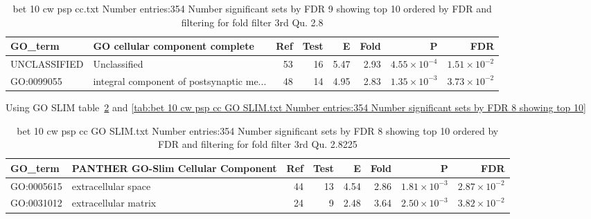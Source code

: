 \begin{table}[ht]
\centering
\begin{adjustbox}{width=\textwidth}
\begin{tabular}{llrrrrrr}
  \hline
GO\_term & GO cellular component complete & Ref & Test & E & Fold & P & FDR \\ 
  \hline
UNCLASSIFIED & Unclassified  & 53 & 16 & 5.47 & 2.93 & $4.55 \times 10^{-4}$ & $1.51 \times 10^{-2}$ \\ 
  GO:0099055 & integral component of postsynaptic me... & 48 & 14 & 4.95 & 2.83 & $1.35 \times 10^{-3}$ & $3.73 \times 10^{-2}$ \\ 
  \hline
\end{tabular}
\end{adjustbox}
\caption{bet 10 cw psp cc.txt Number entries:354 Number significant sets by FDR 9 showing top 10 ordered by FDR and filtering for fold filter 3rd Qu. 2.8} 
\label{tab:bet 10 cw psp cc.txt Number entries:354 Number significant sets by FDR 9 showing top 10 ordered by FDR and filtering for fold filter 3rd Qu. 2.8}
\end{table}

Using GO SLIM table~\ref{tab:bet 10 cw psp cc GO SLIM.txt Number entries:354 Number significant sets by FDR 8 showing top 10 ordered by FDR and filtering for fold filter 3rd Qu. 2.8225}
and \ref{tab:bet 10 cw psp cc GO SLIM.txt Number entries:354 Number significant sets by FDR 8 showing top 10}

\begin{table}[ht]
\centering
\begin{adjustbox}{width=\textwidth}
\begin{tabular}{llrrrrrr}
  \hline
GO\_term & PANTHER GO-Slim Cellular Component & Ref & Test & E & Fold & P & FDR \\ 
  \hline
GO:0005615 & extracellular space  & 44 & 13 & 4.54 & 2.86 & $1.81 \times 10^{-3}$ & $2.87 \times 10^{-2}$ \\ 
  GO:0031012 & extracellular matrix  & 24 & 9 & 2.48 & 3.64 & $2.50 \times 10^{-3}$ & $3.82 \times 10^{-2}$ \\ 
  \hline
\end{tabular}
\end{adjustbox}
\caption{bet 10 cw psp cc GO SLIM.txt Number entries:354 Number significant sets by FDR 8 showing top 10 ordered by FDR and filtering for fold filter 3rd Qu. 2.8225} 
\label{tab:bet 10 cw psp cc GO SLIM.txt Number entries:354 Number significant sets by FDR 8 showing top 10 ordered by FDR and filtering for fold filter 3rd Qu. 2.8225}
\end{table}

